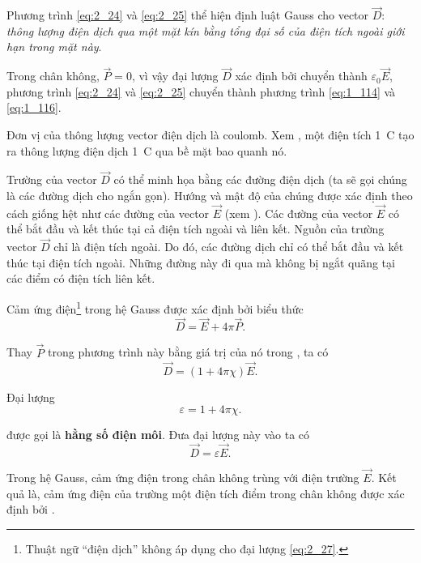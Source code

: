 \noindent
Phương trình \eqref{eq:2_24} và \eqref{eq:2_25} thể hiện định luật Gauss cho vector $\vec{D}$: \textit{thông lượng điện dịch qua một mặt kín bằng tổng đại số của điện tích ngoài giới hạn trong mặt này}.

Trong chân không, $\vec{P}=0$, vì vậy đại lượng $\vec{D}$ xác định bởi  chuyển thành $\varepsilon_0\vec{E}$, phương trình \eqref{eq:2_24} và \eqref{eq:2_25} chuyển thành phương trình \eqref{eq:1_114} và \eqref{eq:1_116}.

Đơn vị của thông lượng vector điện dịch là coulomb. Xem , một điện tích \SI{1}{\coulomb} tạo ra thông lượng điện dịch \SI{1}{\coulomb} qua bề mặt bao quanh nó.

Trường của vector $\vec{D}$ có thể minh họa bằng các đường điện dịch (ta sẽ gọi chúng là các đường dịch cho ngắn gọn). Hướng và mật độ của chúng được xác định theo cách giống hệt như các đường của vector $\vec{E}$ (xem ). Các đường của vector $\vec{E}$ có thể bắt đầu và kết thúc tại cả điện tích ngoài và liên kết. Nguồn của trường vector $\vec{D}$ chỉ là điện tích ngoài. Do đó, các đường dịch chỉ có thể bắt đầu và kết thúc tại điện tích ngoài. Những đường này đi qua mà không bị ngắt quãng tại các điểm có điện tích liên kết.

Cảm ứng điện\footnote{Thuật ngữ ``điện dịch'' không áp dụng cho đại lượng \eqref{eq:2_27}.} trong hệ Gauss được xác định bởi biểu thức
\begin{equation}\label{eq:2_26}
    \vec{D} = \vec{E} + 4\pi\vec{P}.
\end{equation}

\noindent
Thay $\vec{P}$ trong phương trình này bằng giá trị của nó trong , ta có
\begin{equation}\label{eq:2_27}
    \vec{D} = (1 + 4\pi\chi) \vec{E}.
\end{equation}

Đại lượng
\begin{equation}\label{eq:2_28}
    \varepsilon = 1 + 4\pi\chi.
\end{equation}

\noindent
được gọi là \textbf{hằng số điện môi}. Đưa đại lượng này vào  ta có
\begin{equation}\label{eq:2_29}
    \vec{D} = \varepsilon \vec{E}.
\end{equation}

Trong hệ Gauss, cảm ứng điện trong chân không trùng với điện trường $\vec{E}$. Kết quả là, cảm ứng điện của trường một điện tích điểm trong chân không được xác định bởi .

